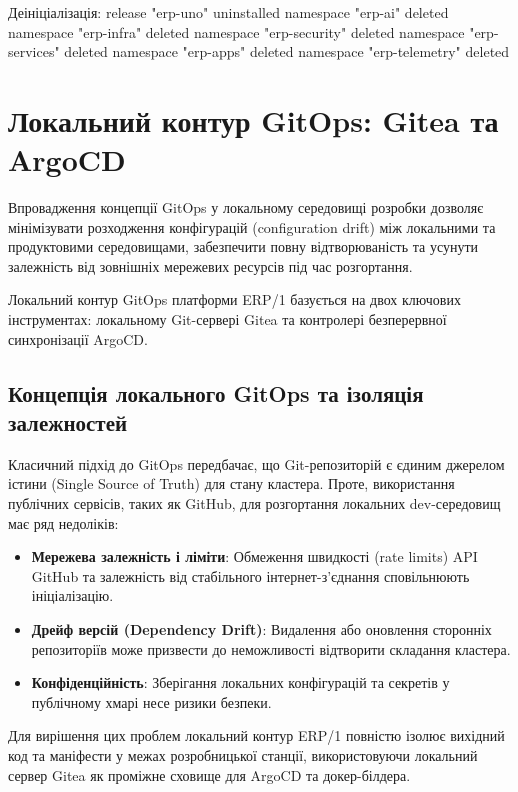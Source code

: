 \documentclass[12pt,a4paper]{article}
\let\originalfootnotesize\footnotesize
\let\oldverbatim\verbatim
\let\oldendverbatim\endverbatim
\renewenvironment{verbatim}{\originalfootnotesize\oldverbatim}{\oldendverbatim}
\begin{document}
Деініціалізація:
\begin{verbatim}
release "erp-uno" uninstalled
namespace "erp-ai" deleted
namespace "erp-infra" deleted
namespace "erp-security" deleted
namespace "erp-services" deleted
namespace "erp-apps" deleted
namespace "erp-telemetry" deleted
\end{verbatim}


\newpage
\section{Локальний контур GitOps: Gitea та ArgoCD}

Впровадження концепції GitOps у локальному середовищі розробки дозволяє мінімізувати розходження конфігурацій (configuration drift) між локальними та продуктовими середовищами, забезпечити повну відтворюваність та усунути залежність від зовнішніх мережевих ресурсів під час розгортання.

Локальний контур GitOps платформи ERP/1 базується на двох ключових інструментах: локальному Git-сервері Gitea та контролері безперервної синхронізації ArgoCD.

\subsection{Концепція локального GitOps та ізоляція залежностей}

Класичний підхід до GitOps передбачає, що Git-репозиторій є єдиним джерелом істини (Single Source of Truth) для стану кластера. Проте, використання публічних сервісів, таких як GitHub, для розгортання локальних dev-середовищ має ряд недоліків:
\begin{itemize}
    \item \textbf{Мережева залежність і ліміти}: Обмеження швидкості (rate limits) API GitHub та залежність від стабільного інтернет-з'єднання сповільнюють ініціалізацію.
    \item \textbf{Дрейф версій (Dependency Drift)}: Видалення або оновлення сторонніх репозиторіїв може призвести до неможливості відтворити складання кластера.
    \item \textbf{Конфіденційність}: Зберігання локальних конфігурацій та секретів у публічному хмарі несе ризики безпеки.
\end{itemize}

Для вирішення цих проблем локальний контур ERP/1 повністю ізолює вихідний код та маніфести у межах розробницької станції, використовуючи локальний сервер Gitea як проміжне сховище для ArgoCD та докер-білдера.
\end{document}

